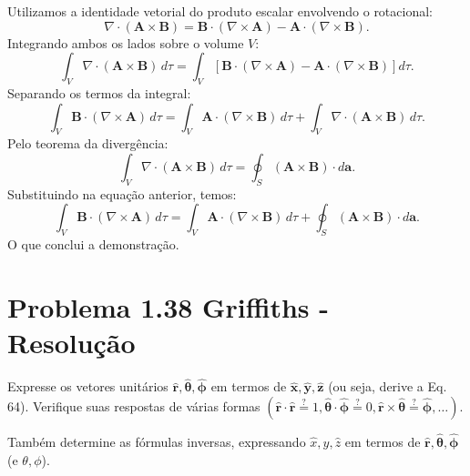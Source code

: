 \documentclass[a4paper,12pt]{article}
\begin{document}
Utilizamos a identidade vetorial do produto escalar envolvendo o rotacional:
\begin{equation}
\nabla \cdot (\mathbf{A} \times \mathbf{B}) = \mathbf{B} \cdot (\nabla \times \mathbf{A}) - \mathbf{A} \cdot (\nabla \times \mathbf{B}).
\end{equation}
Integrando ambos os lados sobre o volume \( V \):
\begin{equation}
\int_V \nabla \cdot (\mathbf{A} \times \mathbf{B}) \, d\tau =
\int_V \left[ \mathbf{B} \cdot (\nabla \times \mathbf{A}) - \mathbf{A} \cdot (\nabla \times \mathbf{B}) \right] d\tau.
\end{equation}
Separando os termos da integral:
\begin{equation}
\int_V \mathbf{B} \cdot (\nabla \times \mathbf{A}) \, d\tau =
\int_V \mathbf{A} \cdot (\nabla \times \mathbf{B}) \, d\tau +
\int_V \nabla \cdot (\mathbf{A} \times \mathbf{B}) \, d\tau.
\end{equation}
Pelo teorema da divergência:
\begin{equation}
\int_V \nabla \cdot (\mathbf{A} \times \mathbf{B}) \, d\tau = \oint_S (\mathbf{A} \times \mathbf{B}) \cdot d\mathbf{a}.
\end{equation}
Substituindo na equação anterior, temos:
\begin{equation}
\int_V \mathbf{B} \cdot (\nabla \times \mathbf{A}) \, d\tau =
\int_V \mathbf{A} \cdot (\nabla \times \mathbf{B}) \, d\tau +
\oint_S (\mathbf{A} \times \mathbf{B}) \cdot d\mathbf{a}.
\end{equation}
O que conclui a demonstração.


\section*{Problema 1.38 Griffiths - Resolu\c{c}\~ao}

Expresse os vetores unitários \( \hat{\mathbf{r}}, \hat{\bm{\theta}}, \hat{\bm{\phi}} \) em termos de \( \hat{\mathbf{x}}, \hat{\mathbf{y}}, \hat{\mathbf{z}} \) 
(ou seja, derive a Eq. 64). Verifique suas respostas de várias formas 
\(\left( \hat{\mathbf{r}} \cdot \hat{\mathbf{r}} \stackrel{?}{=} 1, \hat{\bm{\theta}} \cdot \hat{\bm{\phi}} \stackrel{?}{=} 0, \hat{\mathbf{r}} \times \hat{\bm{\theta}} \stackrel{?}{=} \hat{\bm{\phi}}, \dots \right)\).  

Também determine as fórmulas inversas, expressando \( \hat{x}, \hat{y}, \hat{z} \) em termos de \( \hat{\mathbf{r}}, \hat{\mathbf{\theta}}, \hat{\bm{\phi}} \) (e \( \theta, \phi \)).
\end{document}
